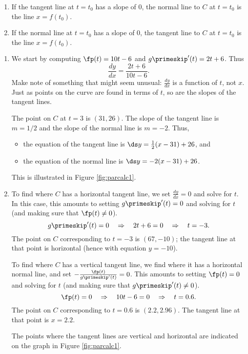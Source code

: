 	
\begin{enumerate}
	\item If the tangent line at $t=t_0$ has a slope of 0, the normal line to $C$ at $t=t_0$ is the line $x=f(t_0)$.
	\item		If the normal line at $t=t_0$ has a slope of 0, the tangent line to $C$ at $t=t_0$ is the line $x=f(t_0)$.
	\end{enumerate}
	
	{\begin{enumerate}
		\item We start by computing $\fp(t) = 10t-6$ and $g\primeskip'(t) =2t+6$. Thus $$\frac{dy}{dx} = \frac{2t+6}{10t-6}.$$
		Make note of something that might seem unusual: $\frac{dy}{dx}$ is a function of $t$, not $x$. Just as points on the curve are found in terms of $t$, so are the slopes of the tangent lines.
		
		The point on $C$ at $t=3$ is $(31,26)$. The slope of the tangent line is $m=1/2$ and the slope of the normal line is $m=-2$. Thus,
		\begin{itemize}
			\item the equation of the tangent line is $\ds y=\frac12(x-31)+26$, and
			\item	the equation of the normal line is $\ds y=-2(x-31)+26$.
		\end{itemize}
		This is illustrated in Figure \ref{fig:parcalc1}.
		
		\item		To find where $C$ has a horizontal tangent line, we set $\frac{dy}{dx}=0$ and solve for $t$. In this case, this amounts to setting $g\primeskip'(t)=0$ and solving for $t$ (and making sure that $\fp(t)\neq 0$). 
		$$g\primeskip'(t)=0 \quad \Rightarrow \quad 2t+6=0 \quad \Rightarrow \quad t=-3.$$
		The point on $C$ corresponding to $t=-3$ is $(67,-10)$; the tangent line at that point is horizontal (hence with equation $y=-10$).
		
		To find where $C$ has a vertical tangent line, we find where it has a horizontal normal line, and set $-\frac{\fp(t)}{g\primeskip'(t)}=0$. This amounts to setting $\fp(t)=0$ and solving for $t$ (and making sure that $g\primeskip'(t)\neq 0$). 
		$$\fp(t)=0 \quad \Rightarrow \quad 10t-6=0 \quad \Rightarrow \quad t=0.6.$$
		The point on $C$ corresponding to $t=0.6$ is $(2.2,2.96)$. The tangent line at that point is $x=2.2$.
	
		The points where the tangent lines are vertical and horizontal are indicated on the graph in Figure \ref{fig:parcalc1}.
		\end{enumerate}}
	
